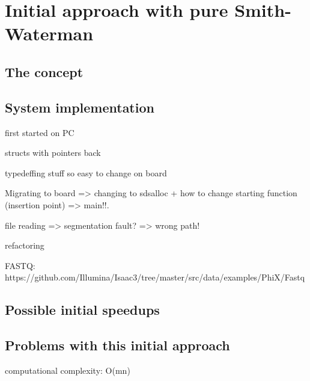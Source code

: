 
\chapter{Initial approach with pure Smith-Waterman}

\section{The concept}

\section{System implementation}

first started on PC

structs with pointers back

typedeffing stuff so easy to change on board

Migrating to board => changing to sdsalloc + how to change starting function (insertion point) => main!!.

file reading => segmentation fault? => wrong path!

refactoring

FASTQ: https://github.com/Illumina/Isaac3/tree/master/src/data/examples/PhiX/Fastq

\section{Possible initial speedups}

\section{Problems with this initial approach}

computational complexity: O(mn)

